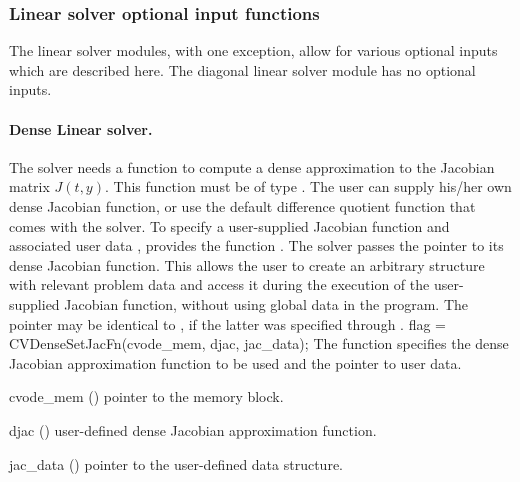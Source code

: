 \subsubsection{Linear solver optional input functions}

The linear solver modules, with one exception, allow for various optional 
inputs which are described here. The diagonal linear solver module has no
optional inputs.

\noindent\paragraph{\bf Dense Linear solver.}
The 
{\cvdense} solver needs a function to compute a dense approximation to
the Jacobian matrix $J(t,y)$.  This function must be of type . 
The user can supply his/her own dense Jacobian function, or use the default 
difference quotient function  
that comes with the {\cvdense} solver.
To specify a user-supplied Jacobian function  and associated user 
data , {\cvdense} provides the function .
The {\cvdense} solver passes the pointer  
to its dense Jacobian function. This allows the user to
create an arbitrary structure with relevant problem data and access it
during the execution of the user-supplied Jacobian function, without
using global data in the program.  The pointer  may be
identical to , if the latter was specified through .
{
  flag = CVDenseSetJacFn(cvode\_mem, djac, jac\_data);
}
{
  The function  specifies the dense Jacobian
  approximation function to be used and the pointer to user data.
}
{
  \begin{args}
  \item[cvode\_mem] ()
    pointer to the {\cvode} memory block.
  \item[djac] ()
    user-defined dense Jacobian approximation function.
  \item[jac\_data] ()
    pointer to the user-defined data structure.
  \end{args}
}
